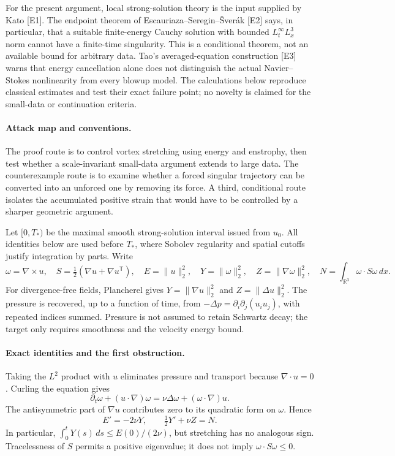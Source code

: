 \documentclass[11pt]{article}
\begin{document}
For the present argument, local strong-solution theory is the input supplied
 by Kato [E1]. The endpoint theorem of Escauriaza--Seregin--\v Sver\'ak [E2]
 says, in particular, that a suitable finite-energy Cauchy solution with
 bounded $L^\infty_tL^3_x$ norm cannot have a finite-time singularity.
 This is a conditional theorem, not an available bound for arbitrary data.
 Tao's averaged-equation construction [E3] warns that energy cancellation
 alone does not distinguish the actual Navier--Stokes nonlinearity from
 every blowup model. The calculations below reproduce classical estimates
 and test their exact failure point; no novelty is claimed for the
 small-data or continuation criteria.

\paragraph{Attack map and conventions.}
The proof route is to control vortex stretching using energy and enstrophy,
 then test whether a scale-invariant small-data argument extends to large
 data. The counterexample route is to examine whether a forced singular
 trajectory can be converted into an unforced one by removing its force.
 A third, conditional route isolates the accumulated positive strain that
 would have to be controlled by a sharper geometric argument.

Let $[0,T_*)$ be the maximal smooth strong-solution interval issued from
 $u_0$. All identities below are used before $T_*$, where Sobolev regularity
 and spatial cutoffs justify integration by parts. Write
\[
 \omega=\nabla\times u,\quad
 S=\tfrac12(\nabla u+\nabla u^{\mathsf T}),\quad
 E=\|u\|_2^2,\quad Y=\|\omega\|_2^2,\quad
 Z=\|\nabla\omega\|_2^2,\quad N=\int_{\mathbb R^3}\omega\cdot S\omega\,dx.
\]
For divergence-free fields, Plancherel gives
 $Y=\|\nabla u\|_2^2$ and $Z=\|\Delta u\|_2^2$.
 The pressure is recovered, up to a function of time, from
 $-\Delta p=\partial_i\partial_j(u_i u_j)$, with repeated indices summed.
 Pressure is not assumed to retain Schwartz decay; the target only requires
 smoothness and the velocity energy bound.

\paragraph{Exact identities and the first obstruction.}
Taking the $L^2$ product with $u$ eliminates pressure and transport because
 $\nabla\cdot u=0$. Curling the equation gives
\[
 \partial_t\omega+(u\cdot\nabla)\omega
 =\nu\Delta\omega+(\omega\cdot\nabla)u.
\]
The antisymmetric part of $\nabla u$ contributes zero to its quadratic form
 on $\omega$. Hence
\begin{equation}\label{ns:balances}
 E'=-2\nu Y,\qquad \tfrac12Y'+\nu Z=N.
\end{equation}
In particular, $\int_0^tY(s)\,ds\leq E(0)/(2\nu)$, but stretching has no
 analogous sign. Tracelessness of $S$ permits a positive eigenvalue; it
 does not imply $\omega\cdot S\omega\leq0$.
\end{document}
